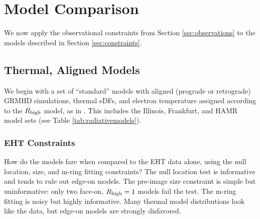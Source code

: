 \section{Model Comparison}\label{sec:comparisons}

We now apply the observational constraints from Section \ref{sec:observations} to the models described in Section \ref{sec:constraints}.

\subsection{Thermal, Aligned Models}\label{subsec:thermal}

We begin with a set of ``standard'' models with aligned (prograde or retrograde) GRMHD simulations, thermal eDFs, and electron temperature assigned according to the $R_\mathrm{high}$ model, as in .  This includes the Illinois, Frankfurt, and HAMR model sets (see Table \ref{tab:radiativemodels}).

\subsubsection{EHT Constraints}

How do the models fare when compared to the EHT data alone, using the null location, size, and m-ring fitting constraints?  The null location test is informative and tends to rule out edge-on models.  The pre-image size constraint is simple but uninformative: only two face-on, $R_\mathrm{high} = 1$ models fail the test.   The m-ring fitting is noisy but highly informative.  Many thermal model distributions look like the data, but edge-on models are strongly disfavored.




